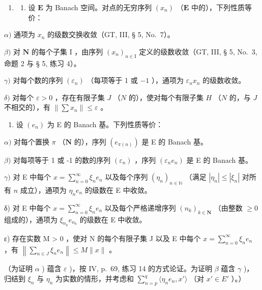 \begin{enumerate}
\def\labelenumi{\arabic{enumi})}
\setcounter{enumi}{15}
\tightlist
\item
  \begin{enumerate}
  \def\labelenumii{\alph{enumii})}
  \tightlist
  \item
    设 \(\mathbf{E}\) 为 Banach 空间。对点的无穷序列 \((x_{n})\) （\(\mathbf{E}\) 中的），下列性质等价：
  \end{enumerate}
\end{enumerate}

\(\alpha)\) 通项为 \(x_{n}\) 的级数交换收敛（GT, III, § 5, No.~7）。

\(\beta)\) 对 \(\mathbf{N}\) 的每个子集 I ，由序列 \((x_{n})_{n\in \mathrm{I}}\) 定义的级数收敛（GT, III, § 5, No.~3, 命题 2 与 § 5, 练习 4）。

\(\gamma)\) 对每个数的序列 \((\varepsilon_{n})\) （每项等于 1 或 \(-1\) ），通项为 \(\varepsilon_{n}x_{n}\) 的级数收敛。

\(\delta)\) 对每个 \(\varepsilon > 0\) ，存在有限子集 \(J\) （\(N\) 的），使对每个有限子集 \(H\) （\(N\) 的，与 \(J\) 不相交的），有 \(\| \sum x_n \| \leqslant \varepsilon\) 。

\begin{enumerate}
\def\labelenumi{\alph{enumi})}
\setcounter{enumi}{1}
\tightlist
\item
  设 \((e_n)\) 为 E 的 Banach 基。下列性质等价：
\end{enumerate}

\(\alpha)\) 对每个置换 \(\pi\) （\(\mathbf{N}\) 的），序列 \((e_{\pi(n)})\) 是 E 的 Banach 基。

\(\beta)\) 对每项等于 1 或 -1 的数的序列 \((\varepsilon_{n})\) ，序列 \((\varepsilon_{n}e_{n})\) 是 E 的 Banach 基。

\(\gamma)\) 对 E 中每个 \(x = \sum_{n=0}^{\infty} \xi_n e_n\) 以及每个序列 \((\eta_n)_{n \in \mathbb{N}}\) （满足 \(|\eta_n| \leqslant |\xi_n|\) 对所有 \(n\) 成立），通项为 \(\eta_n e_n\) 的级数在 E 中收敛。

δ) 对 E 中每个 \(x = \sum_{n=0}^{\infty} \xi_n e_n\) 以及每个严格递增序列 \((n_k)_{k \in \mathbf{N}}\) （由整数 \(\geqslant 0\) 组成的），通项为 \(\xi_{n_k} e_{n_k}\) 的级数在 E 中收敛。

ε) 存在实数 M \textgreater{} 0 ，使对 N 的每个有限子集 J 以及 E 中每个 \(x = \sum_{n=0}^{\infty} \xi_{n} e_{n}\) ，有 \(\left\|\sum_{n \in J} \xi_{n} e_{n}\right\| \leqslant M \|x\|\) 。

（为证明 \(\alpha\) ) 蕴含 \(\varepsilon\) )，按 IV, p.~69, 练习 14 的方式论证。为证明 \(\beta\) 蕴含 \(\gamma\) )，归结到 \(\xi_{n}\) 与 \(\eta_{n}\) 为实数的情形，并考虑和 \(\sum_{n=p}^{q} \langle \eta_{n} e_{n}, x' \rangle\) （对 \(x' \in E'\) ）。）

